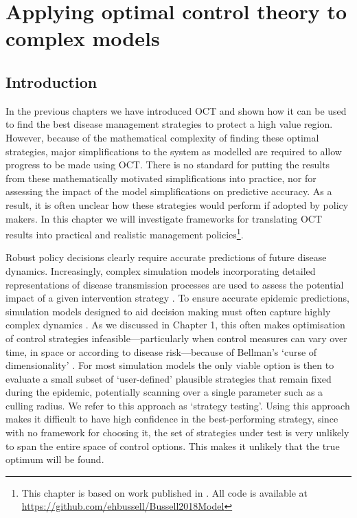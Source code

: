 %
\chapter{Applying optimal control theory to complex models\label{ch:complex_models}}

\section{Introduction\label{sec:ch4:Intro}}

In the previous chapters we have introduced OCT and shown how it can be used to find the best disease management strategies to protect a high value region. However, because of the mathematical complexity of finding these optimal strategies, major simplifications to the system as modelled are required to allow progress to be made using OCT\@. There is no standard for putting the results from these mathematically motivated simplifications into practice, nor for assessing the impact of the model simplifications on predictive accuracy. As a result, it is often unclear how these strategies would perform if adopted by policy makers. In this chapter we will investigate frameworks for translating OCT results into practical and realistic management policies\footnote{This chapter is based on work published in \citet{bussell_applying_2019}. All code is available at \url{https://github.com/ehbussell/Bussell2018Model}}.

Robust policy decisions clearly require accurate predictions of future disease dynamics. Increasingly, complex simulation models incorporating detailed representations of disease transmission processes are used to assess the potential impact of a given intervention strategy \citep{lofgren_opinion_2014}. To ensure accurate epidemic predictions, simulation models designed to aid decision making must often capture highly complex dynamics \citep{savary_simulation_2014}. As we discussed in Chapter 1, this often makes optimisation of control strategies infeasible---particularly when control measures can vary over time, in space or according to disease risk---because of Bellman's `curse of dimensionality' \citep{bellman_dynamic_1957}. For most simulation models the only viable option is then to evaluate a small subset of `user-defined' plausible strategies that remain fixed during the epidemic, potentially scanning over a single parameter such as a culling radius. We refer to this approach as `strategy testing'. Using this approach makes it difficult to have high confidence in the best-performing strategy, since with no framework for choosing it, the set of strategies under test is very unlikely to span the entire space of control options. This makes it unlikely that the true optimum will be found.

